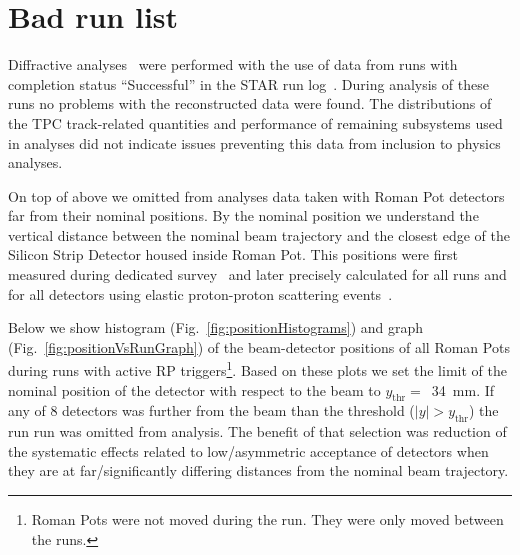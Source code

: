

\chapter{Bad run list}\label{chap:badRunList}

Diffractive analyses~\cite{AnalysisNoteRafal,AnalysisNoteLukasz} were performed with the use of data from runs with completion status ``Successful'' in the STAR run log~\cite{RunLog}. During analysis of these runs no problems with the reconstructed data were found. The distributions of the TPC track-related quantities and performance of remaining subsystems used in analyses did not indicate issues preventing this data from inclusion to physics analyses.

On top of above we omitted from analyses data taken with Roman Pot detectors far from their nominal positions. By the nominal position we understand the vertical distance between the nominal beam trajectory and the closest edge of the Silicon Strip Detector housed inside Roman Pot. This positions were first measured during dedicated survey~\cite{surveyNote} and later precisely calculated for all runs and for all detectors using elastic proton-proton scattering events~\cite{alignmentPresentation,alignmentDirectory}.%

Below we show histogram (Fig.~\ref{fig:positionHistograms}) and graph (Fig.~\ref{fig:positionVsRunGraph}) of the beam-detector positions of all Roman Pots during runs with active RP triggers\footnote{Roman Pots were not moved during the run. They were only moved between the runs.}. Based on these plots we set the limit of the nominal position of the detector with respect to the beam to $y_{\text{thr}} =$~34~mm. If any of 8 detectors was further from the beam than the threshold ($|y|>y_{\text{thr}}$) the run run was omitted from analysis. The benefit of that selection was reduction of the systematic effects related to low/asymmetric acceptance of detectors when they are at far/significantly differing distances from the nominal beam trajectory.

